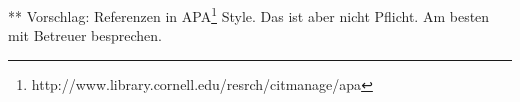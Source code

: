 \documentclass{thesisclass}
\begin{document}

\frontmatter
{}



\tableofcontents



\mainmatter
{}







\cleardoublepage
{}
{}

{}	%
{}	%

												  



\vspace{2cm}
** Vorschlag: Referenzen in APA\footnote{http://www.library.cornell.edu/resrch/citmanage/apa} Style. Das ist aber nicht Pflicht. Am besten mit Betreuer besprechen.
\end{document}
